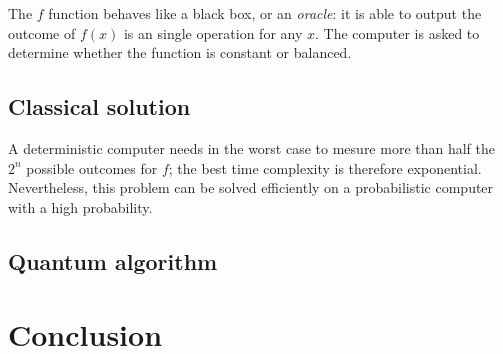 \documentclass[12pt,a4paper]{article}
\theoremstyle{plain}
\theoremstyle{definition}
\begin{document}
The $f$ function behaves like a black box, or an \emph{oracle}: it is able to output the outcome of $f(x)$ is an single operation for any $x$. The computer is asked to determine whether the function is constant or balanced.

\subsection{Classical solution}
A deterministic computer needs in the worst case to mesure more than half the $2^n$ possible outcomes for $f$; the best time complexity is therefore exponential. Nevertheless, this problem can be solved efficiently on a probabilistic computer with a high probability.

\subsection{Quantum algorithm}

\section*{Conclusion}

\nocite{*}
\printbibliography
\end{document}
